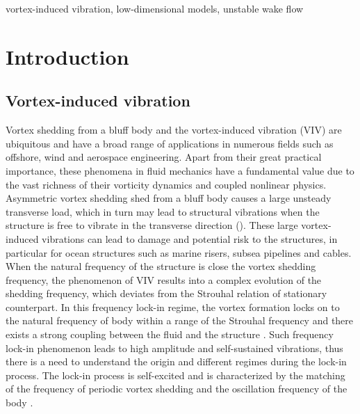 \documentclass{jfm}
\begin{document}
\begin{keywords}
vortex-induced vibration, low-dimensional models, unstable wake flow
\end{keywords}

\section{Introduction}\label{sec:intro}


\subsection{Vortex-induced vibration}
Vortex shedding from a bluff body and the vortex-induced vibration (VIV) are ubiquitous 
and have a broad range of applications in numerous fields such 
as offshore, wind and aerospace engineering. Apart from their great practical 
importance, these phenomena in fluid mechanics have a fundamental value 
due to the vast richness of their vorticity dynamics and coupled nonlinear physics.
Asymmetric vortex shedding shed from a bluff 
body causes a large unsteady transverse load, which in turn may lead to structural 
vibrations when the structure is free 
to vibrate in the transverse direction (\cite{sarpkaya2004,williamson2004,bearman2011}). 
These large vortex-induced vibrations can lead to damage and potential risk to the structures, 
in particular for ocean structures such as marine risers, subsea pipelines and cables.
%
When the natural frequency of the structure is close the vortex shedding frequency, 
the phenomenon of VIV results into a complex evolution of the shedding frequency, which 
deviates from the Strouhal relation of stationary counterpart. In this 
frequency lock-in regime, the vortex formation locks on to the natural frequency of body 
within a range of the Strouhal frequency and there exists a strong coupling 
between the fluid and the structure \citep{sarpkaya2004}. Such frequency lock-in 
phenomenon leads to high amplitude and self-sustained vibrations, thus there is a need 
to understand the origin and different regimes during the lock-in process. 
%
The lock-in process is self-excited and is characterized by the matching of the frequency 
of periodic vortex shedding and the oscillation frequency of the body \citep{khalak1999}.
%
%
\end{document}
